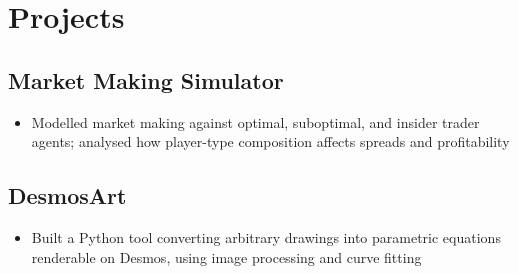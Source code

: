 \documentclass[11pt]{article} %
\begin{document}
\section{Projects}
\subsection{Market Making Simulator}
\begin{itemize}
\item Modelled market making against optimal, suboptimal, and insider trader 
agents; analysed how player-type composition affects spreads and profitability
\end{itemize}
\subsection{DesmosArt}
\begin{itemize}
\item Built a Python tool converting arbitrary drawings into parametric equations 
renderable on Desmos, using image processing and curve fitting
\end{itemize}
\end{document}
